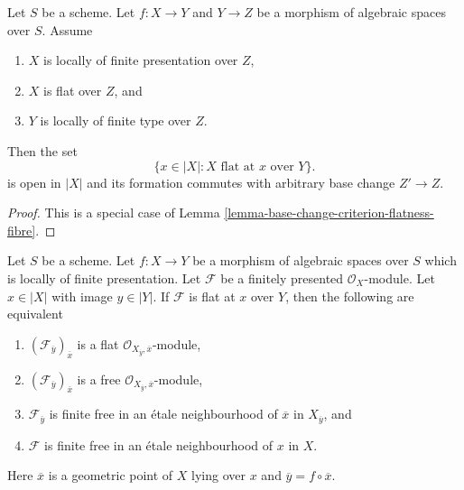 \begin{lemma}
\label{lemma-base-change-flatness-fibres}
Let $S$ be a scheme.
Let $f : X \to Y$ and $Y \to Z$ be a morphism of algebraic spaces over $S$.
Assume
\begin{enumerate}
\item $X$ is locally of finite presentation over $Z$,
\item $X$ is flat over $Z$, and
\item $Y$ is locally of finite type over $Z$.
\end{enumerate}
Then the set
$$
\{x \in |X| : X\text{ flat at }x \text{ over }Y\}.
$$
is open in $|X|$ and its formation commutes with arbitrary base change
$Z' \to Z$.
\end{lemma}

\begin{proof}
This is a special case of
Lemma \ref{lemma-base-change-criterion-flatness-fibre}.
\end{proof}

\begin{lemma}
\label{lemma-flat-and-free-at-point-fibre}
Let $S$ be a scheme. Let $f : X \to Y$ be a morphism of algebraic spaces
over $S$ which is locally of finite presentation.
Let $\mathcal{F}$ be a finitely presented $\mathcal{O}_X$-module.
Let $x \in |X|$ with image $y \in |Y|$. If $\mathcal{F}$ is flat at $x$
over $Y$, then the following are equivalent
\begin{enumerate}
\item $(\mathcal{F}_{\overline{y}})_{\overline{x}}$ is a flat
$\mathcal{O}_{X_{\overline{y}}, \overline{x}}$-module,
\item $(\mathcal{F}_{\overline{y}})_{\overline{x}}$ is a free
$\mathcal{O}_{X_{\overline{y}}, \overline{x}}$-module,
\item $\mathcal{F}_{\overline{y}}$ is finite free in an
\'etale neighbourhood of $\overline{x}$ in $X_{\overline{y}}$, and
\item $\mathcal{F}$ is finite free in an \'etale neighbourhood of $x$ in $X$.
\end{enumerate}
Here $\overline{x}$ is a geometric point of $X$ lying over $x$
and $\overline{y} = f \circ \overline{x}$.
\end{lemma}

